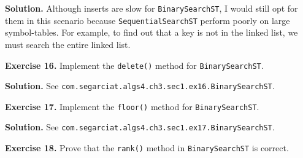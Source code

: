 \documentclass[12pt, a4paper]{article}
\newenvironment{ex}[2][Exercise]
{\par\medskip\noindent \textbf{#1 #2.}}
{\medskip}
\newenvironment{sol}[1][Solution]
{\par\medskip\noindent \textbf{#1.} }
{\medskip}
\begin{document}
	\begin{sol}
		Although inserts are slow for \texttt{BinarySearchST}, I would still opt for
		them in this scenario because \texttt{SequentialSearchST} perform poorly
		on large symbol-tables. For example, to find out that a key is not in the 
		linked list, we must search the entire linked list.
	\end{sol}
	\begin{ex}{16}
		Implement the \texttt{delete()} method for \texttt{BinarySearchST}.
	\end{ex}
	\begin{sol}
		See \texttt{com.segarciat.algs4.ch3.sec1.ex16.BinarySearchST}.
	\end{sol}
	\begin{ex}{17}
		Implement the \texttt{floor()} method for \texttt{BinarySearchST}.
	\end{ex}
	\begin{sol}
		See \texttt{com.segarciat.algs4.ch3.sec1.ex17.BinarySearchST}.
	\end{sol}
	\begin{ex}{18}
		Prove that the \texttt{rank()} method in \texttt{BinarySearchST} is correct.
	\end{ex}
\end{document}
